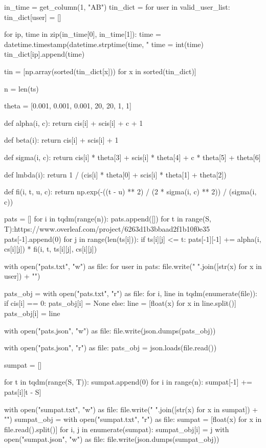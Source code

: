 \documentclass{article} %
\begin{document}
\begin{python}
in_time = get_column(1, "AB")
tin_dict = {}
for user in valid_user_list:
    tin_dict[user] = []

for ip, time in zip(in_time[0], in_time[1]):
    time = datetime.timestamp(datetime.strptime(time, "%
    time = int(time)
    tin_dict[ip].append(time)

tin = [np.array(sorted(tin_dict[x])) for x in sorted(tin_dict)]

n = len(ts)

theta = [0.001, 0.001, 0.001, 20, 20, 1, 1]


def alpha(i, c):
    return cis[i] + scis[i] + c + 1


def beta(i):
    return cis[i] + scis[i] + 1


def sigma(i, c):
    return cis[i] * theta[3] + scis[i] * theta[4] + c * theta[5] + theta[6]


def lmbda(i):
    return 1 / (cis[i] * theta[0] + scis[i] * theta[1] + theta[2])


def fi(i, t, u, c):
    return np.exp(-((t - u) ** 2) / (2 * sigma(i, c) ** 2)) / (sigma(i, c))


pats = []
for i in tqdm(range(n)):
    pats.append([])
    for t in range(S, T):https://www.overleaf.com/project/6263d1b3bbaad2f1b10f0e35
        pats[-1].append(0)
        for j in range(len(ts[i])):
            if ts[i][j] <= t:
                pats[-1][-1] += alpha(i, cs[i][j]) * fi(i, t, ts[i][j], cs[i][j])

with open("pats.txt", "w") as file:
    for user in pats:
        file.write(" ".join([str(x) for x in user]) + "\n")

pats_obj = {}
with open("pats.txt", "r") as file:
    for i, line in tqdm(enumerate(file)):
        if cis[i] == 0:
            pats_obj[i] = None
        else:
            line = [float(x) for x in line.split()]
            pats_obj[i] = line

with open("pats.json", "w") as file:
    file.write(json.dumps(pats_obj))

with open("pats.json", "r") as file:
    pats_obj = json.loads(file.read())

sumpat = []

for t in tqdm(range(S, T)):
    sumpat.append(0)
    for i in range(n):
        sumpat[-1] += pats[i][t - S]

with open("sumpat.txt", "w") as file:
    file.write(" ".join([str(x) for x in sumpat]) + "\n")
sumpat_obj = {}
with open("sumpat.txt", "r") as file:
    sumpat = [float(x) for x in file.read().split()]
    for i, j in enumerate(sumpat):
        sumpat_obj[i] = j
with open("sumpat.json", "w") as file:
    file.write(json.dumps(sumpat_obj))


\end{python}
\end{document}

